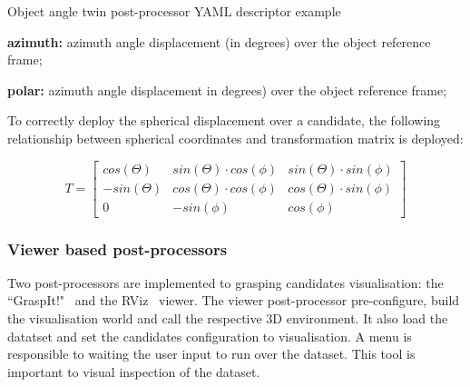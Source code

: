 \begin{snippet}[h!]
\centering
{}
\caption{Object angle twin post-processor YAML descriptor example}
\label{code:obj_angle_twin}
\end{snippet}

\begin{itemize_jp}
    \item \textbf{azimuth:} azimuth angle displacement (in degrees) over the object reference frame;
    \item \textbf{polar:} azimuth angle displacement in degrees) over the object reference frame;
\end{itemize_jp}

To correctly deploy the spherical displacement over a candidate, the following relationship between spherical coordinates and transformation matrix is deployed:

\begin{equation}
T=\begin{bmatrix}
cos(\Theta) & sin(\Theta)\cdot cos(\phi) & sin(\Theta)\cdot sin(\phi) \\
-sin(\Theta)& cos(\Theta)\cdot cos(\phi)& cos(\Theta)\cdot sin(\phi) \\
0 & -sin(\phi) & cos(\phi)
\end{bmatrix}
\end{equation}



\subsubsection{Viewer based post-processors}
\label{cap4:modular_grasping_architecture:sec:grasping_synthesis:subsec:postprocessor:subsubsec:viewers}

Two post-processors are implemented to grasping candidates visualisation: the ``GraspIt!"~\cite{miller2004graspit} and the RViz~\cite{rviz} viewer. The viewer post-processor pre-configure, build the visualisation world and call the respective 3D environment. It also load the datatset and set the candidates configuration to visualisation. A menu is responsible to waiting the user input to run over the dataset. This tool is important to visual inspection of the dataset.

